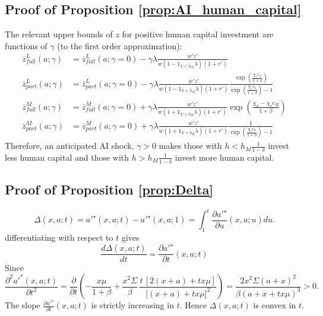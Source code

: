 \documentclass[12pt,english]{article}
\newcommand{\mathbbm}{\mathds}
\numberwithin{equation}{section}
\begin{document}
{\subsection{Proof of Proposition \ref{prop:AI_human_capital}}
The relevant upper bounds of $z$ for positive human capital investment are functions of $\gamma$ (to the first order approximation):
\begin{align*}
    \overline{z}^L_{full}(a;\gamma)&= \overline{z}^L_{full}(a;\gamma=0) - \gamma \lambda  \frac{w'z'}{w\left(1-\mathbbm{1}_{h < h_M}\lambda\right)(1+r')}\\
    \overline{z}^L_{part}(a;\gamma)&= \overline{z}^L_{part}(a;\gamma=0) - \gamma \lambda \frac{w'z'}{w\left(1-\mathbbm{1}_{h < h_M}\lambda\right)(1+r')}\frac{\exp(\frac{\chi_e e_L}{1+\beta})}{\exp(\frac{\chi_e e_L}{1+\beta})-1} \\
    \overline{z}^M_{full}(a;\gamma)&=\overline{z}^M_{full}(a;\gamma=0) + \gamma \lambda \frac{w'z'}{w\left(1+\mathbbm{1}_{h > h_H}\lambda\right)(1+r')}\exp(\frac{\chi_n-\chi_e e_H}{1+\beta})\\
    \overline{z}^M_{part}(a;\gamma)&= \overline{z}^M_{part}(a;\gamma=0) + \gamma \lambda \frac{w'z'}{w\left(1+\mathbbm{1}_{h > h_H}\lambda\right)(1+r')}\frac{1}{\exp(\frac{\chi_e e_L}{1+\beta})-1}
\end{align*}
Therefore, an anticipated AI shock, $\gamma>0$ makes those with $h<h_M\frac{1}{1-\delta}$ invest less human capital and those with $h>h_M\frac{1}{1-\delta}$ invest more human capital.


\subsection{Proof of Proposition \ref{prop:Delta}}

\[
    \Delta(x,a;t) = a'^\star(x,a;t) - a'^\star(x,a;1) = \int_1^t \frac{\partial a'^\star}{\partial u}(x,a;u) du.
\]
differentiating with respect to $t$ gives
\[\frac{d \Delta(x,a;t)}{d t} = \frac{\partial a'^\star}{\partial t}(x,a;t) 
\]
Since
\begin{equation}
    \frac{\partial^2 a'^*(x,a;t)}{\partial t^2}  = \frac{\partial}{\partial t} \left( -\frac{x\mu}{1+\beta}
    +
    \frac{x^2 \Sigma}{\beta}\,
    \frac{t\,[2(x+a) + t x \mu]}{\big[(x+a) + t x \mu\big]^2} \right) = \frac{2x^2\Sigma(a+x)^2}{\beta(a +x + tx\mu)^3} > 0.
\end{equation}
The slope $\frac{\partial a'^\star}{\partial t}(x,a;t)$ is strictly increasing in $t$. Hence $\Delta(x,a;t)$ is convex in $t$.

}
\end{document}

